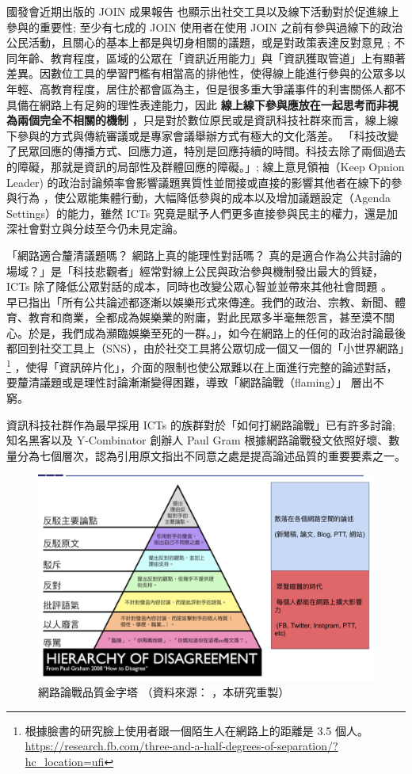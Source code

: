 \documentclass[12pt,a4paper]{article}
\begin{document}
國發會近期出版的 JOIN 成果報告 \citep*{chuang18,lin18a} 也顯示出社交工具以及線下活動對於促進線上參與的重要性; 至少有七成的 JOIN 使用者在使用 JOIN 之前有參與過線下的政治公民活動，且關心的基本上都是與切身相關的議題，或是對政策表達反對意見 ; 不同年齡、教育程度，區域的公眾在「資訊近用能力」與「資訊獲取管道」上有顯著差異。因數位工具的學習門檻有相當高的排他性，使得線上能進行參與的公眾多以年輕、高教育程度，居住於都會區為主，但是很多重大爭議事件的利害關係人都不具備在網路上有足夠的理性表達能力，因此 \textbf{線上線下參與應放在一起思考而非視為兩個完全不相關的機制} ，只是對於數位原民或是資訊科技社群來而言，線上線下參與的方式與傳統審議或是專家會議舉辦方式有極大的文化落差。
 「科技改變了民眾回應的傳播方式、回應力道，特別是回應持續的時間。科技去除了兩個過去的障礙，那就是資訊的局部性及群體回應的障礙。」\citep*[p.141]{xue11_xiang}; 線上意見領袖（Keep Opnion Leader) 的政治討論頻率會影響議題異質性並間接或直接的影響其他者在線下的參與行為 \citep*{lin18b} ，使公眾能集體行動，大幅降低參與的成本以及增加議題設定（Agenda Settings）的能力，雖然 ICTs 究竟是賦予人們更多直接參與民主的權力，還是加深社會對立與分歧至今仍未見定論。

「網路適合釐清議題嗎？ 網路上真的能理性對話嗎？ 真的是適合作為公共討論的場域？」是「科技悲觀者」經常對線上公民與政治參與機制發出最大的質疑，ICTs 除了降低公眾對話的成本，同時也改變公眾心智並並帶來其他社會問題 \citep*{stev11} 。 \citep*{neil16} 早已指出「所有公共論述都逐漸以娛樂形式來傳達。我們的政治、宗教、新聞、體育、教育和商業，全都成為娛樂業的附庸，對此民眾多半毫無怨言，甚至漠不關心。於是，我們成為瀕臨娛樂至死的一群。」，如今在網路上的任何的政治討論最後都回到社交工具上（SNS），由於社交工具將公眾切成一個又一個的「小世界網路」\footnote{根據臉書的研究臉上使用者跟一個陌生人在網路上的距離是 3.5 個人。 \url{https://research.fb.com/three-and-a-half-degrees-of-separation/?hc\_location=ufi}} ，使得「資訊碎片化」，介面的限制也使公眾難以在上面進行完整的論述對話，要釐清議題或是理性討論漸漸變得困難，導致「網路論戰（flaming）」\citep*{wiki:flaming} 層出不窮。

資訊科技社群作為最早採用 ICTs 的族群對於「如何打網路論戰」已有許多討論; 知名黑客以及 Y-Combinator 創辦人 Paul Gram 根據網路論戰發文依照好壞、數量分為七個層次，認為引用原文指出不同意之處是提高論述品質的重要要素之一。\citep*{paul08}

\begin{figure}[htbp]
\centering
\includegraphics[width=.9\linewidth]{./images/how-to-disagree.png}
\caption{\label{fig:org189cd62}
網路論戰品質金字塔 （資料來源： \citep{zhu_2015} ，本研究重製）}
\end{figure}
\end{document}
